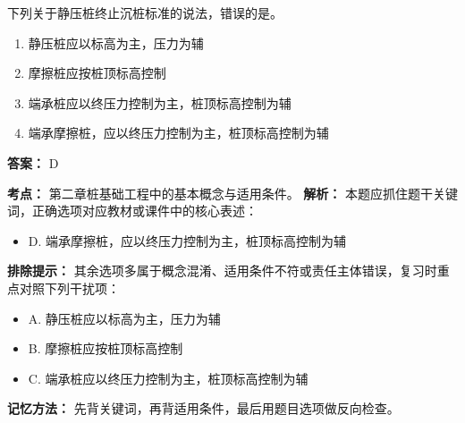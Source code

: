 \documentclass[UTF8,fontset=fandol,11pt]{ctexart}
\begin{document}
\begin{quizbox}[title={第 2 题}]
下列关于静压桩终止沉桩标准的说法，错误的是。\\
\begin{enumerate}[label=\Alph*.]
\item 静压桩应以标高为主，压力为辅
\item 摩擦桩应按桩顶标高控制
\item 端承桩应以终压力控制为主，桩顶标高控制为辅
\item 端承摩擦桩，应以终压力控制为主，桩顶标高控制为辅
\end{enumerate}
\textbf{答案：} D
\vspace{0.25em}
\begin{answerbox}[title={考点解析}]
\textbf{考点：} 第二章桩基础工程中的基本概念与适用条件。
\textbf{解析：} 本题应抓住题干关键词，正确选项对应教材或课件中的核心表述：
\begin{itemize}
\item D. 端承摩擦桩，应以终压力控制为主，桩顶标高控制为辅
\end{itemize}
\textbf{排除提示：} 其余选项多属于概念混淆、适用条件不符或责任主体错误，复习时重点对照下列干扰项：
\begin{itemize}
\item A. 静压桩应以标高为主，压力为辅
\item B. 摩擦桩应按桩顶标高控制
\item C. 端承桩应以终压力控制为主，桩顶标高控制为辅
\end{itemize}
\textbf{记忆方法：} 先背关键词，再背适用条件，最后用题目选项做反向检查。
\end{answerbox}
\end{quizbox}

\vspace{0.2em}
\end{document}
